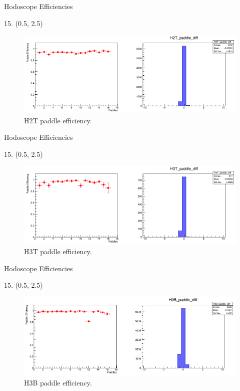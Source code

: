 \documentclass[12pt, xcolor={dvipsnames}, aspectratio = 169, sans,mathserif]{beamer}
\newenvironment{Pic}[2]
{
\begin{textblock}{#1} #2
\begin{figure}
}
{
\end{figure}
\end{textblock}
}
\begin{document}
\begin{frame}{Hodoscope Efficiencies}
\begin{Pic}{15.}{(0.5, 2.5)}
  \includegraphics[width=15.0cm]{imgs/H2T_paddle_diff.png}
  \caption{H2T paddle efficiency.}
\end{Pic}
\end{frame}

\begin{frame}{Hodoscope Efficiencies}
\begin{Pic}{15.}{(0.5, 2.5)}
  \includegraphics[width=15.0cm]{imgs/H3T_paddle_diff.png}
  \caption{H3T paddle efficiency.}
\end{Pic}
\end{frame}

\begin{frame}{Hodoscope Efficiencies}
\begin{Pic}{15.}{(0.5, 2.5)}
  \includegraphics[width=15.0cm]{imgs/H3B_paddle_diff.png}
  \caption{H3B paddle efficiency.}
\end{Pic}
\end{frame}
\end{document}
